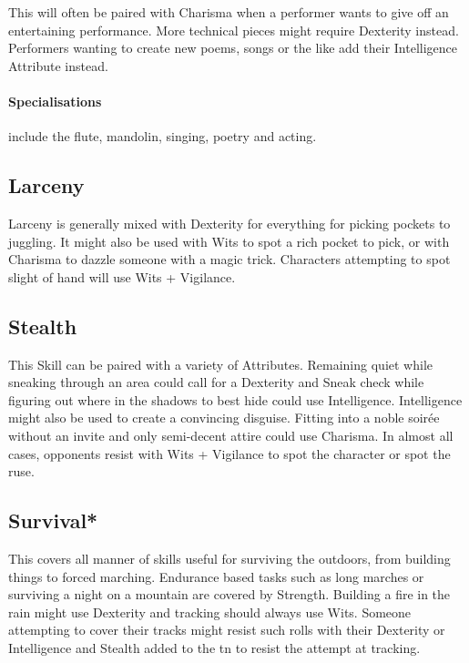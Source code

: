 \begin{multicols}{2}
This will often be paired with Charisma when a performer wants to give off an entertaining performance. More technical pieces might require Dexterity instead. Performers wanting to create new poems, songs or the like add their Intelligence Attribute instead.

\paragraph{Specialisations} include the flute, mandolin, singing, poetry and acting.

\subsection{Larceny}

Larceny is generally mixed with Dexterity for everything for picking pockets to juggling.
It might also be used with Wits to spot a rich pocket to pick, or with Charisma to dazzle someone with a magic trick.
Characters attempting to spot slight of hand will use Wits + Vigilance.

\subsection{Stealth}

This Skill can be paired with a variety of Attributes.
Remaining quiet while sneaking through an area could call for a Dexterity and Sneak check while figuring out where in the shadows to best hide could use Intelligence.
Intelligence might also be used to create a convincing disguise.
Fitting into a noble soir\'{e}e without an invite and only semi-decent attire could use Charisma.
In almost all cases, opponents resist with Wits + Vigilance to spot the character or spot the ruse.

\subsection{Survival*}

This covers all manner of skills useful for surviving the outdoors, from building things to forced marching. Endurance based tasks such as long marches or surviving a night on a mountain are covered by Strength. Building a fire in the rain might use Dexterity and tracking should always use Wits. Someone attempting to cover their tracks might resist such rolls with their Dexterity or Intelligence and Stealth added to the \gls{tn} to resist the attempt at tracking.


\end{multicols}
